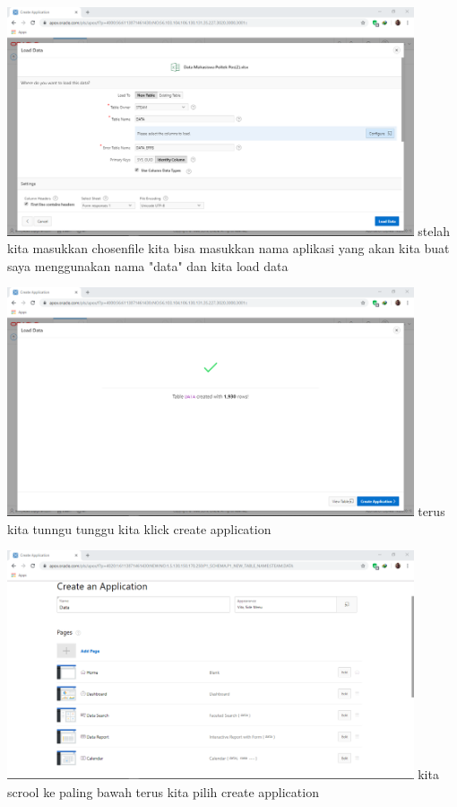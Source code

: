 \documentclass[12pt, times news roman, a4paper] {article}
\begin{document}
\begin{minipage}{\linewidth}
	\centering
	\includegraphics[width=12cm]{Gambar6.png} 
	 {stelah kita masukkan chosenfile kita bisa masukkan nama aplikasi yang akan kita buat saya menggunakan nama "data" dan kita load data }
\end{minipage}

\begin{minipage}{\linewidth}
	\centering
	\includegraphics[width=12cm]{Gambar7.png} 
	 {terus kita tunngu tunggu kita klick create application}
\end{minipage}

\begin{minipage}{\linewidth}
	\centering
	\includegraphics[width=12cm]{Gambar8.png} 
	 {kita scrool ke paling bawah terus kita pilih create application }
\end{minipage}
\end{document}
